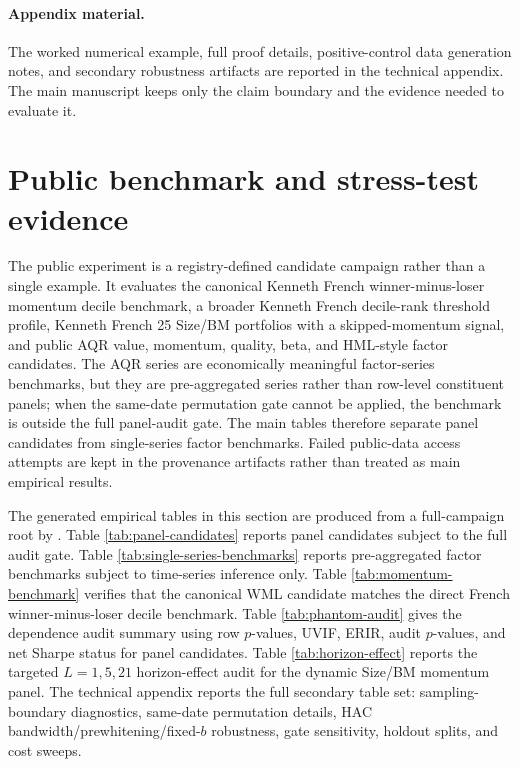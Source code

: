 \documentclass[12pt,a4paper]{article}
\begin{document}


\paragraph{Appendix material.}
The worked numerical example, full proof details, positive-control data
generation notes, and secondary robustness artifacts are reported in the
technical appendix.  The main manuscript keeps only the claim boundary
and the evidence needed to evaluate it.

\section{Public benchmark and stress-test evidence}
\label{sec:empirical}

The public experiment is a registry-defined candidate campaign rather than
a single example.  It evaluates the canonical Kenneth French
winner-minus-loser momentum decile benchmark, a broader Kenneth French
decile-rank threshold profile, Kenneth French 25 Size/BM portfolios with
a skipped-momentum signal, and public AQR value, momentum, quality, beta,
and HML-style factor candidates.  The AQR series are economically meaningful
factor-series benchmarks, but they are pre-aggregated series rather than
row-level constituent panels; when the same-date permutation gate cannot
be applied, the benchmark is outside the full panel-audit gate.  The
main tables therefore separate panel candidates from single-series
factor benchmarks.  Failed public-data access attempts are kept in the
provenance artifacts rather than treated as main empirical results.

The generated empirical tables in this section are produced from a
full-campaign root by .  Table
\ref{tab:panel-candidates} reports panel candidates subject to the full
audit gate.  Table \ref{tab:single-series-benchmarks} reports
pre-aggregated factor benchmarks subject to time-series inference only.
Table \ref{tab:momentum-benchmark} verifies that the canonical WML
candidate matches the direct French winner-minus-loser decile benchmark.
Table \ref{tab:phantom-audit} gives the dependence audit
summary using row \(p\)-values, UVIF, ERIR, audit \(p\)-values, and net
Sharpe status for panel candidates.  Table \ref{tab:horizon-effect}
reports the targeted \(L=1,5,21\) horizon-effect audit for the dynamic
Size/BM momentum panel.  The technical appendix reports the full
secondary table set: sampling-boundary diagnostics, same-date
permutation details, HAC bandwidth/prewhitening/fixed-\(b\) robustness,
gate sensitivity, holdout splits, and cost sweeps.
\end{document}
